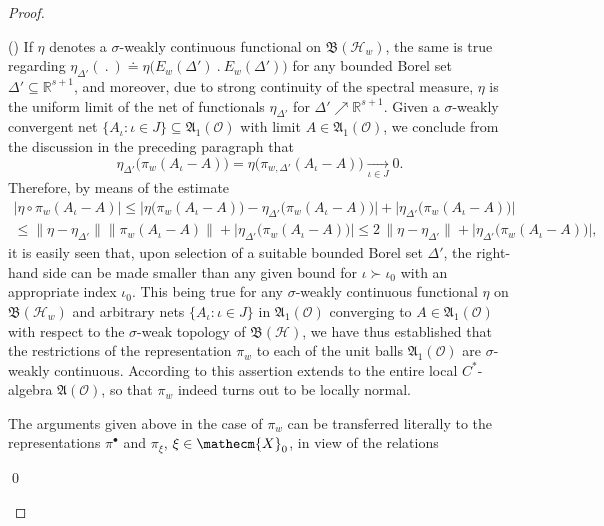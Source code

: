 \documentclass[11pt,twoside,openright]{report}
\theoremstyle{definition}
\theoremstyle{plain}
\theoremstyle{remark}
\theoremstyle{assumption}
\newcommand{\bset}[1]{\bigl\{ #1 \bigr\}}
\newcommand{\babs}[1]{\bigl\lvert #1 \bigr\rvert}
\newcommand{\bnorm}[1]{\bigl\lVert #1 \bigr\rVert}
\newcommand{\Xecm}{\mathecm{X}}
\newcommand{\Rsone}{\mathbb{R}^{s + 1}}
\newcommand{\BH}{\mathfrak{B} ( \mathscr{H} )}
\newcommand{\BHw}{\mathfrak{B} ( \mathscr{H}_w )}
\newcommand{\EwDprime}{E_w ( \Delta' )}
\newcommand{\AO}{\mathfrak{A} ( \mathscr{O} )}
\newcommand{\AoneO}{\mathfrak{A}_1 ( \mathscr{O} )}
\newcommand{\piwDprime}{\pi_{w , \Delta'}}
\newcommand{\etaDprime}{\eta_{\Delta'}}
\newcounter{proofitem}
\newenvironment{prooflist}{\begin{list}{(\roman{proofitem})}%
  {\usecounter{proofitem} \setlength{\topsep}{0ex}%
   \setlength{\parsep}{0.2ex} \setlength{\itemsep}{0.4ex}%
   \setlength{\leftmargin}{0em} \setlength{\itemindent}{0.5em}%
   \setlength{\listparindent}{1em}}}{\qed \end{list}}
\begin{document}
\begin{proof}
\begin{prooflist}
    If $\eta$ denotes a $\sigma$-weakly continuous functional on
    $\BHw$, the same is true regarding $\etaDprime (~.~) \doteq \eta
    \bigl( \EwDprime~.~\EwDprime \bigr)$ for any bounded Borel set
    $\Delta' \subseteq \Rsone$, and moreover, due to strong continuity
    of the spectral measure, $\eta$ is the uniform limit of the net of
    functionals $\etaDprime$ for $\Delta' \nearrow \Rsone$. Given a
    $\sigma$-weakly convergent net $\bset{A_\iota : \iota \in J}
    \subseteq \AoneO$ with limit $A \in \AoneO$, we conclude from the
    discussion in the preceding paragraph that
    \begin{equation}
      \label{eq-sigma-weak-Delta-limit}
      \etaDprime \bigl( \pi_w ( A_\iota - A ) \bigr) = \eta \bigl(
      \piwDprime ( A_\iota - A ) \bigr) \xrightarrow[\iota \in J]{} 0
      \text{.}
    \end{equation}
    Therefore, by means of the estimate
    \begin{multline}
      \label{eq-sigma-weak-limit}
      \babs{\eta \circ \pi_w ( A_\iota - A )} \leqslant \babs{\eta
      \bigl( \pi_w ( A_\iota - A ) \bigr) - \etaDprime \bigl( \pi_w (
      A_\iota - A ) \bigr)} + \babs{\etaDprime \bigl( \pi_w ( A_\iota
      - A ) \bigr)} \\
      \leqslant \bnorm{\eta - \etaDprime} \bnorm{\pi_w ( A_\iota - A
      )} + \babs{\etaDprime \bigl( \pi_w ( A_\iota - A ) \bigr)}
      \leqslant 2 \, \bnorm{\eta - \etaDprime} + \babs{\etaDprime
      \bigl( \pi_w ( A_\iota - A ) \bigr)} \text{,}
    \end{multline}
    it is easily seen that, upon selection of a suitable bounded Borel
    set $\Delta'$, the right-hand side can be made smaller than any
    given bound for $\iota \succ \iota_0$ with an appropriate index
    $\iota_0$. This being true for any $\sigma$-weakly continuous
    functional $\eta$ on $\BHw$ and arbitrary nets $\bset{A_\iota :
    \iota \in J}$ in $\AoneO$ converging to $A \in \AoneO$ with
    respect to the $\sigma$-weak topology of $\BH$, we have thus
    established that the restrictions of the representation $\pi_w$ to
    each of the unit balls $\AoneO$ are $\sigma$-weakly
    continuous. According to
    \cite[Lemma~10.1.10]{kadison/ringrose:1986} this assertion extends
    to the entire local $C^*$-algebra $\AO$, so that $\pi_w$ indeed
    turns out to be locally normal.
  \item The arguments given above in the case of $\pi_w$ can be
    transferred literally to the representations $\pi^\bullet$ and
    $\pi_\xi$, $\xi \in \Xecm_0$, in view of the relations

\end{prooflist}
\end{proof}
\end{document}
